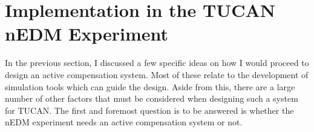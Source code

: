 






\section{Implementation in the TUCAN nEDM Experiment}\label{sec:implemantation}


In the previous section, I discussed a few specific ideas on how I would proceed to design an active compensation system. Most of these relate to the development of simulation tools which can guide the design. Aside from this, there are a large number of other factors that must be considered when designing such a system for TUCAN. The first and foremost question is to be answered is whether the nEDM experiment needs an active compensation system or not. 

